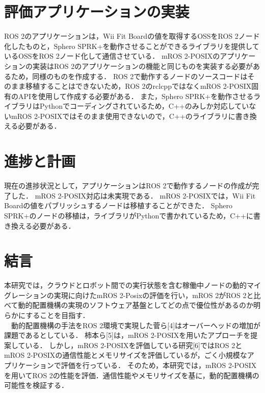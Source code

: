 \documentclass[11pt]{ujarticle}
\begin{document}
\section{評価アプリケーションの実装}
ROS 2のアプリケーションは，Wii Fit Boardの値を取得するOSSをROS 2ノード化したものと，Sphero SPRK+を動作させることができるライブラリを提供しているOSSをROS 2ノード化して通信させている．
mROS 2-POSIXのアプリケーションの実装はROS 2のアプリケーションの機能と同じものを実装する必要があるため，同様のものを作成する．
ROS 2で動作するノードのソースコードはそのまま移植することはできないため，ROS 2のrclcppではなくmROS 2-POSIX固有のAPIを使用して作成する必要がある．
また，Sphero SPRK+を動作させるライブラリはPythonでコーディングされているため，C++のみしか対応していないmROS 2-POSIXではそのまま使用できないので，C++のライブラリに書き換える必要がある．
\section{進捗と計画}
現在の進捗状況として，アプリケーションはROS 2で動作するノードの作成が完了した．
mROS 2-POSIX対応は未実現である．
mROS 2-POSIXでは，Wii Fit Boardの値をパブリッシュするノードは移植することができた．
Sphero SPRK+のノードの移植は，ライブラリがPythonで書かれているため，C++に書き換える必要がある．

\section{結言}
本研究では，クラウドとロボット間での実行状態を含む稼働中ノードの動的マイグレーションの実現に向けたmROS 2-Posixの評価を行い，mROS 2がROS 2と比べて動的配置機構の実現のソフトウェア基盤としてどの点で優位性があるのか明らかにすることを目指す．
\\　動的配置機構の手法をROS 2環境で実現した菅ら[4]はオーバーヘッドの増加が課題であるとしている．
柿本ら[5]は，mROS 2-POSIXを用いたアプローチを提案している．
しかし，mROS 2-POSIXを評価している研究[6]ではROS 2とmROS 2-POSIXの通信性能とメモリサイズを評価しているが，ごく小規模なアプリケーションで評価を行っている．
そのため，本研究では，mROS 2-POSIXを用いてROS 2の性能を評価．通信性能やメモリサイズを基に，動的配置機構の可能性を検証する．
\end{document}

